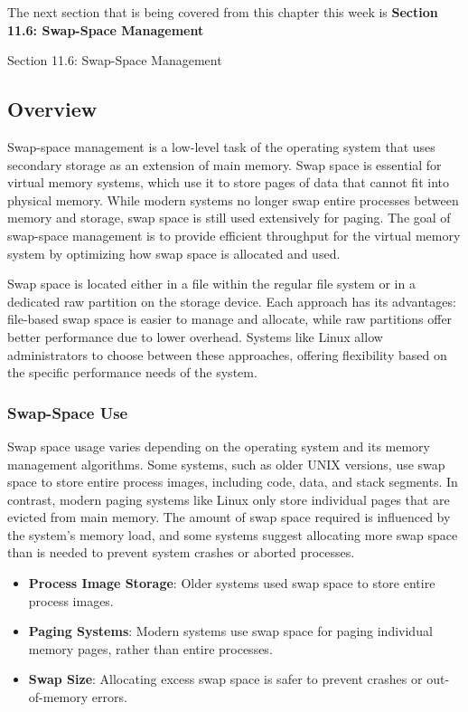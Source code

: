 The next section that is being covered from this chapter this week is \textbf{Section 11.6: Swap-Space Management}

\begin{notes}{Section 11.6: Swap-Space Management}

    \subsection*{Overview}
    
    Swap-space management is a low-level task of the operating system that uses secondary storage as an extension of main memory. Swap space is essential for virtual memory systems, which use it to 
    store pages of data that cannot fit into physical memory. While modern systems no longer swap entire processes between memory and storage, swap space is still used extensively for paging. The 
    goal of swap-space management is to provide efficient throughput for the virtual memory system by optimizing how swap space is allocated and used.
    
    Swap space is located either in a file within the regular file system or in a dedicated raw partition on the storage device. Each approach has its advantages: file-based swap space is easier to manage 
    and allocate, while raw partitions offer better performance due to lower overhead. Systems like Linux allow administrators to choose between these approaches, offering flexibility based on the 
    specific performance needs of the system.

    \subsubsection*{Swap-Space Use}
    
    Swap space usage varies depending on the operating system and its memory management algorithms. Some systems, such as older UNIX versions, use swap space to store entire process images, including 
    code, data, and stack segments. In contrast, modern paging systems like Linux only store individual pages that are evicted from main memory. The amount of swap space required is influenced by the 
    system's memory load, and some systems suggest allocating more swap space than is needed to prevent system crashes or aborted processes.
    
    \begin{highlight}
    
        \begin{itemize}
            \item \textbf{Process Image Storage}: Older systems used swap space to store entire process images.
            \item \textbf{Paging Systems}: Modern systems use swap space for paging individual memory pages, rather than entire processes.
            \item \textbf{Swap Size}: Allocating excess swap space is safer to prevent crashes or out-of-memory errors.
        \end{itemize}
    

\end{highlight}
\end{notes}
